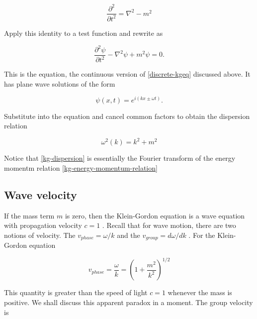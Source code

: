 \begin{equation}
\frac{\partial^2}{ \partial t^2} = \nabla^2 - m^2
\end{equation}


Apply  this  identity  to  a  test  function  and  rewrite  as



\begin{equation}
\label{kgeq}
\frac{\partial^2 \psi}{ \partial t^2} - \nabla^2\psi + m^2\psi = 0.
\end{equation}


This  is  the    equation,  the  continuous  version  of   \eqref{discrete-kgeq} discussed  above.   It  has  plane  wave  solutions  of  the
 form



\begin{equation}
\psi(x,t) = e^{i(kx \pm \omega t)}.
\end{equation}


Substitute  into  the  equation  and  cancel  common  factors  to  obtain  the 
 dispersion  relation



\begin{equation}
\label{kg-dispersion}
\omega^2(k) = k^2 + m^2
\end{equation}


Notice  that   \eqref{kg-dispersion} is  essentially  the  Fourier  transform  of  the  energy  momentm  relation   \eqref{kg-energy-momentum-relation}

 \subsection{Wave  velocity}

If  the  mass  term   $m$  is  zero,  then  the  Klein-Gordon  equation  is  a  wave  equation  with  propagation  velocity   $c = 1$ .   Recall  that  for  wave  motion,  there  are  two  notions  of  velocity.   The     $v_{phase} = \omega/k$  and  the     $v_{group} = d\omega/dk$ .   For  the  Klein-Gordon  equation



\begin{equation}
v_{phase} = \frac{\omega}{k} = \left(1 + \frac{m^2}{ k^2} \right)^{1/2}
\end{equation}


This  quantity  is  greater  than  the  speed  of  light   $c = 1$  whenever  the  mass  is  positive.   We  shall  discuss  this  apparent  paradox  in  a  moment.   The  group  velocity
 is




